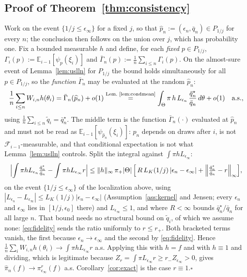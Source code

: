 \documentclass[10pt]{article}
\theoremstyle{plain}
\theoremstyle{definition}
\begin{document}
\subsection{Proof of Theorem~\ref{thm:consistency}}\label{app:theory-consistency}
Work on the event $\{1/j\le\epsilon_\infty\}$ for a fixed $j$, so that $\widehat p_n:=(\epsilon_n,\bar q_n)\in P_{1/j}$ for every $n$; the conclusion then follows on the union over $j$, which has probability one. Fix a bounded measurable $h$ and define, for each \emph{fixed} $p\in P_{1/j}$, $\Gamma_i(p):=\mathbb{E}_{i-1}[\psi_p(\xi_i)]$ and $\bar\Gamma_n(p):=\tfrac1n\sum_{i\le n}\Gamma_i(p)$. On the almost-sure event of Lemma~\ref{lem:uslln} for $P_{1/j}$ the bound holds simultaneously for all $p\in P_{1/j}$, so the \emph{function} $\bar\Gamma_n$ may be evaluated at the random $\widehat p_n$:
\begin{equation}
\frac1n\sum_{i\le n}W_{i,n}h(\theta_i)
=\bar\Gamma_n(\widehat p_n)+o(1)
\overset{\text{Lem.\ \ref{lem:condmean}}}{=}\int_\Theta \pi\,h\,L_{\epsilon_n}\,\frac{\bar q^\star_n}{\bar q_n}\,d\theta+o(1)
\quad\text{a.s.},
\label{eq:app-consistency-main}
\end{equation}
using $\tfrac1n\sum_{i\le n}\tilde q_i=\bar q^\star_n$. The middle term is the function $\bar\Gamma_n(\cdot)$ evaluated at $\widehat p_n$ and must not be read as $\mathbb{E}_{i-1}[\psi_{\widehat p_n}(\xi_i)]$: $\widehat p_n$ depends on draws after $i$, is not $\mathcal{F}_{i-1}$-measurable, and that conditional expectation is not what Lemma~\ref{lem:uslln} controls. Split the integral against $\int\pi hL_{\epsilon_\infty}$:
\[
\Bigl|\int \pi h L_{\epsilon_n}\tfrac{\bar q^\star_n}{\bar q_n}-\int\pi hL_{\epsilon_\infty}r\Bigr|
\le \|h\|_\infty\,\pi_+|\Theta|\,\Bigl[\,R\,L_K(1/j)\,|\epsilon_n-\epsilon_\infty|
+\Bigl\|\tfrac{\bar q^\star_n}{\bar q_n}-r\Bigr\|_\infty\Bigr],
\]
on the event $\{1/j\le\epsilon_\infty\}$ of the localization above, using $|L_{\epsilon_n}-L_{\epsilon_\infty}|\le L_K(1/j)|\epsilon_n-\epsilon_\infty|$ (Assumption~\ref{ass:kernel} and Jensen; every $\epsilon_n$ and $\epsilon_\infty$ lies in $[1/j,\epsilon_0]$ there) and $L_{\epsilon_\infty}\le1$, and where $R<\infty$ bounds $\bar q^\star_n/\bar q_n$ for all large $n$. That bound needs no structural bound on $\tilde q_i$, of which we assume none: \eqref{eq:fidelity} sends the ratio uniformly to $r\le r_+$. Both bracketed terms vanish, the first because $\epsilon_n\to\epsilon_\infty$ and the second by \eqref{eq:fidelity}. Hence $\tfrac1n\sum_iW_{i,n}h(\theta_i)\to\int\pi hL_{\epsilon_\infty}r$ a.s. Applying this with $h=f$ and with $h\equiv1$ and dividing, which is legitimate because $Z_r=\int\pi L_{\epsilon_\infty}r\ge r_-Z_{\epsilon_\infty}>0$, gives $\widehat\pi_n(f)\to\pi^r_{\epsilon_\infty}(f)$ a.s. Corollary~\ref{cor:exact} is the case $r\equiv1$.\hfill$\square$
\end{document}
